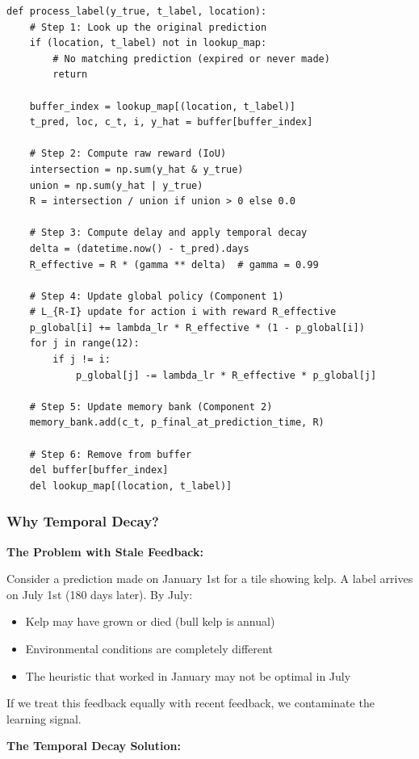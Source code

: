 \documentclass[11pt]{article}
\begin{document}
\begin{verbatim}
def process_label(y_true, t_label, location):
    # Step 1: Look up the original prediction
    if (location, t_label) not in lookup_map:
        # No matching prediction (expired or never made)
        return

    buffer_index = lookup_map[(location, t_label)]
    t_pred, loc, c_t, i, y_hat = buffer[buffer_index]

    # Step 2: Compute raw reward (IoU)
    intersection = np.sum(y_hat & y_true)
    union = np.sum(y_hat | y_true)
    R = intersection / union if union > 0 else 0.0

    # Step 3: Compute delay and apply temporal decay
    delta = (datetime.now() - t_pred).days
    R_effective = R * (gamma ** delta)  # gamma = 0.99

    # Step 4: Update global policy (Component 1)
    # L_{R-I} update for action i with reward R_effective
    p_global[i] += lambda_lr * R_effective * (1 - p_global[i])
    for j in range(12):
        if j != i:
            p_global[j] -= lambda_lr * R_effective * p_global[j]

    # Step 5: Update memory bank (Component 2)
    memory_bank.add(c_t, p_final_at_prediction_time, R)

    # Step 6: Remove from buffer
    del buffer[buffer_index]
    del lookup_map[(location, t_label)]
\end{verbatim}

\subsubsection{Why Temporal Decay?}

\textbf{The Problem with Stale Feedback:}

Consider a prediction made on January 1st for a tile showing kelp. A label arrives on July 1st (180 days later). By July:
\begin{itemize}
    \item Kelp may have grown or died (bull kelp is annual)
    \item Environmental conditions are completely different
    \item The heuristic that worked in January may not be optimal in July
\end{itemize}

If we treat this feedback equally with recent feedback, we contaminate the learning signal.

\textbf{The Temporal Decay Solution:}
\end{document}
